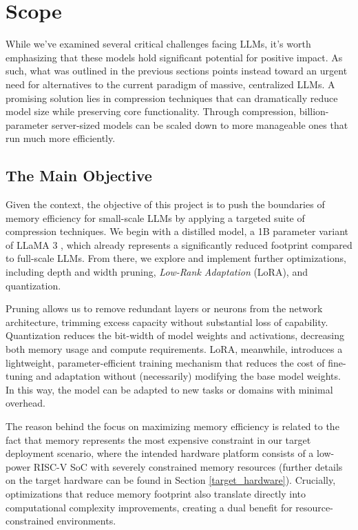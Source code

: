 \section{Scope}
While we've examined several critical challenges facing LLMs, it's worth emphasizing that these models hold significant potential for positive impact. As such, what was outlined in the previous sections points instead toward an urgent need for alternatives to the current paradigm of massive, centralized LLMs. A promising solution lies in compression techniques that can dramatically reduce model size while preserving core functionality. Through compression, billion-parameter server-sized models can be scaled down to more manageable ones that run much more efficiently.

\subsection{The Main Objective}
Given the context, the objective of this project is to push the boundaries of memory efficiency for small-scale LLMs by applying a targeted suite of compression techniques. We begin with a distilled model, a 1B parameter variant of LLaMA 3 \cite{llama3_1b}, which already represents a significantly reduced footprint compared to full-scale LLMs. From there, we explore and implement further optimizations, including depth and width pruning, \textit{Low-Rank Adaptation} (LoRA), and quantization.

Pruning allows us to remove redundant layers or neurons from the network architecture, trimming excess capacity without substantial loss of capability. Quantization reduces the bit-width of model weights and activations, decreasing both memory usage and compute requirements. LoRA, meanwhile, introduces a lightweight, parameter-efficient training mechanism that reduces the cost of fine-tuning and adaptation without (necessarily) modifying the base model weights. In this way, the model can be adapted to new tasks or domains with minimal overhead.

The reason behind the focus on maximizing memory efficiency is related to the fact that memory represents the most expensive constraint in our target deployment scenario, where the intended hardware platform consists of a low-power RISC-V SoC with severely constrained memory resources (further details on the target hardware can be found in Section \ref{target_hardware}). Crucially, optimizations that reduce memory footprint also translate directly into computational complexity improvements, creating a dual benefit for resource-constrained environments.

